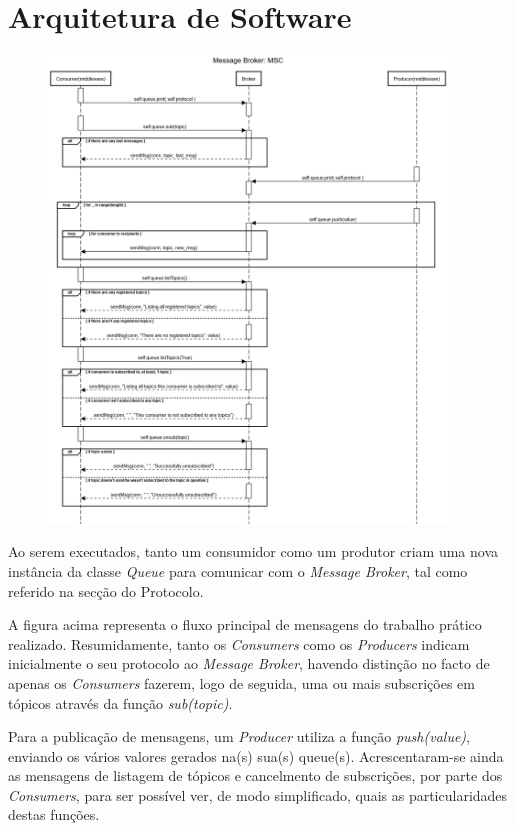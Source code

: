 \documentclass[10pt,portuguese]{article}
\begin{document}
\section{Arquitetura de Software}
\begin{figure}[!h]
    \centering
    \includegraphics[width=400]{mscMB.png}
\end{figure}

\par Ao serem executados, tanto um consumidor como um produtor criam uma nova instância da classe \textit{Queue} para comunicar com o \textit{Message Broker}, tal como referido na secção do Protocolo.

\par A figura acima representa o fluxo principal de mensagens do trabalho prático realizado. Resumidamente, tanto os \textit{Consumers} como os \textit{Producers} indicam inicialmente o seu protocolo ao \textit{Message Broker}, havendo distinção no facto de apenas os \textit{Consumers} fazerem, logo de seguida, uma ou mais subscrições em tópicos através da função \textit{sub(topic)}.

\par Para a publicação de mensagens, um \textit{Producer} utiliza a função \textit{push(value)}, enviando os vários valores gerados na(s) sua(s) queue(s). Acrescentaram-se  ainda as mensagens de listagem de tópicos e cancelmento de subscrições, por parte dos \textit{Consumers}, para ser possível ver, de modo simplificado, quais as particularidades destas funções.
\end{document}
